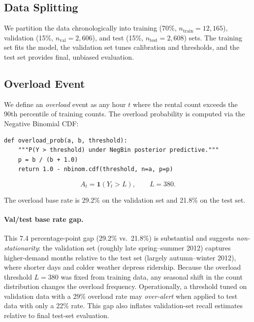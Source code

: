 \documentclass[12pt]{article}
\begin{document}
\subsection{Data Splitting}

We partition the data chronologically into training (70\%, $n_{\text{train}} = 12{,}165$),
validation (15\%, $n_{\text{val}} = 2{,}606$), and test (15\%,
$n_{\text{test}} = 2{,}608$) sets.  The training set fits the model,
the validation set tunes calibration and thresholds, and the test set
provides final, unbiased evaluation.

\subsection{Overload Event}

We define an \emph{overload} event as any hour $t$ where the rental
count exceeds the 90th percentile of training counts.  The overload
probability is computed via the Negative Binomial CDF:
\begin{small}
\begin{verbatim}
def overload_prob(a, b, threshold):
    """P(Y > threshold) under NegBin posterior predictive."""
    p = b / (b + 1.0)
    return 1.0 - nbinom.cdf(threshold, n=a, p=p)
\end{verbatim}
\end{small}

\begin{equation}
A_t = \mathbf{1}(Y_t > L),
\qquad L = 380.
\end{equation}

The overload base rate is 29.2\% on the validation set and 21.8\% on
the test set.

\paragraph{Val/test base rate gap.}
This 7.4 percentage-point gap (29.2\% vs.\ 21.8\%) is substantial and
suggests \emph{non-stationarity}: the validation set (roughly late
spring--summer 2012) captures higher-demand months relative to the
test set (largely autumn--winter 2012), where shorter days and colder
weather depress ridership.  Because the overload threshold $L = 380$
was fixed from training data, any seasonal shift in the count
distribution changes the overload frequency.  Operationally, a
threshold tuned on validation data with a 29\% overload rate may
\emph{over-alert} when applied to test data with only a 22\% rate.
This gap also inflates validation-set recall estimates relative to
final test-set evaluation.
\end{document}
